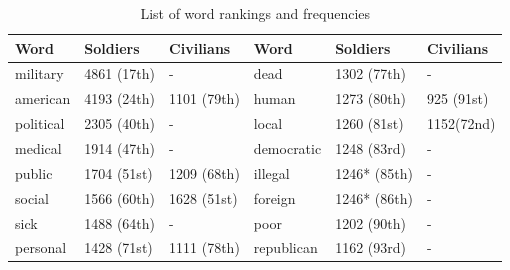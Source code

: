\begin{table}[h]
  \caption{List of word rankings and frequencies}
  \label{table:wordsComparison}
  \centering
  \renewcommand{\tabularxcolumn}{m} %
  \begin{tabularx}{\textwidth}{l | l | l || l | l | l}
    \toprule
    \textbf{Word} & \textbf{Soldiers} & \textbf{Civilians} & \textbf{Word} & \textbf{Soldiers} & \textbf{Civilians}
    \tabularnewline \midrule
    military
                  &
    4861 (17th)   & -                 & dead               & 1302 (77th)   & -
    \tabularnewline \hline
    american
                  & 4193 (24th)       & 1101 (79th)        & human         & 1273 (80th)       & 925 (91st)
    \tabularnewline \hline
    political
                  & 2305 (40th)       & -                  & local         & 1260 (81st)       & 1152(72nd)
    \tabularnewline \hline
    medical
                  & 1914 (47th)       & -                  & democratic
                  & 1248 (83rd)       & -
    \tabularnewline \hline
    public
                  & 1704 (51st)       & 1209 (68th)        & illegal
                  & 1246* (85th)      & -
    \tabularnewline \hline
    social
                  & 1566 (60th)       & 1628 (51st)        & foreign
                  & 1246* (86th)      & -
    \tabularnewline \hline
    sick
                  & 1488 (64th)       & -                  & poor
                  & 1202 (90th)       & -
    \tabularnewline \hline
    personal
                  & 1428 (71st)       & 1111 (78th)        & republican
                  & 1162 (93rd)       & -
    \tabularnewline \bottomrule
  \end{tabularx}
\end{table}
